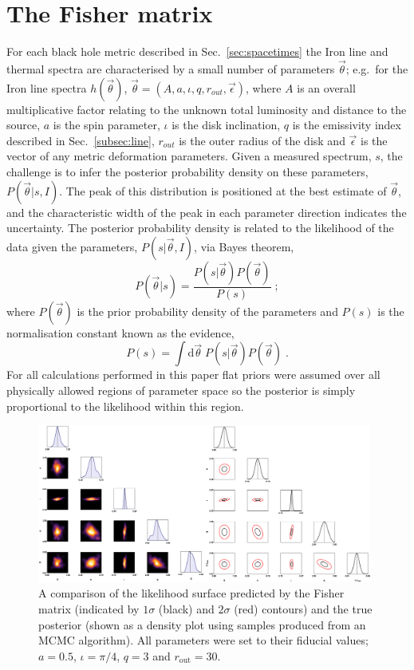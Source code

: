 \section{The Fisher matrix}\label{sec:analysis}
For each black hole metric described in Sec.\ \ref{sec:spacetimes} the Iron line and thermal spectra are characterised by a small number of parameters $\vec{\theta}$; e.g.\ for the Iron line spectra $h(\vec{\theta})$, $\vec{\theta}=(A,a,\iota,q,r_{out},\vec{\epsilon})$, where $A$ is an overall multiplicative factor relating to the unknown total luminosity and distance to the source, $a$ is the spin parameter, $\iota$ is the disk inclination, $q$ is the emissivity index described in Sec.\ \ref{subsec:line}, $r_{out}$ is the outer radius of the disk and $\vec{\epsilon}$ is the vector of any metric deformation parameters. Given a measured spectrum, $s$, the challenge is to infer the posterior probability density on these parameters, $P(\vec{\theta}|s,I)$. The peak of this distribution is positioned at the best estimate of $\vec{\theta}$, and the characteristic width of the peak in each parameter direction indicates the uncertainty. The posterior probability density is related to the likelihood of the data given the parameters, $P(s|\vec{\theta},I)$, via Bayes theorem,
\begin{equation}\label{eq:Bayes} P(\vec{\theta}|s)= \frac{P(s|\vec{\theta})P(\vec{\theta})}{P(s)}\; ;\end{equation}
where $P(\vec{\theta})$ is the prior probability density of the parameters and $P(s)$ is the normalisation constant known as the evidence,
\begin{equation} P(s)=\int\textrm{d}\vec{\theta}\;P(s|\vec{\theta})P(\vec{\theta}) \;.\end{equation}
For all calculations performed in this paper flat priors were assumed over all physically allowed regions of parameter space so the posterior is simply proportional to the likelihood within this region.

\begin{figure}[t]
 \centering
 \includegraphics[trim=0cm 0cm 0cm 0cm, width=0.98\textwidth]{FishMCMC.png}
 \caption{A comparison of the likelihood surface predicted by the Fisher matrix (indicated by $1\sigma$ (black) and $2\sigma$ (red) contours) and the true posterior (shown as a density plot using samples produced from an MCMC algorithm). All parameters were set to their fiducial values; $a=0.5$, $\iota=\pi/4$, $q=3$ and $r_{\textrm{out}}=30$.}
 \label{fig:FishMCMC}
\end{figure}

